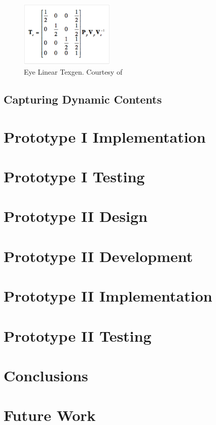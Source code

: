 \documentclass[]{article}
\begin{document}
\begin{figure}[hbtp]
    \centering
    \includegraphics[width=0.4\textwidth]{figures/EyeLinearTexgen.PNG}
    \caption{Eye Linear Texgen. Courtesy of \cite{cassNvidia}}
    \label{fig:EyeLinearTexgen}
\end{figure}

\subsection{Capturing Dynamic Contents}

\section{Prototype I Implementation}
\section{Prototype I Testing }
\section{Prototype II Design }
\section{Prototype II Development}
\section{Prototype II Implementation}
\section{Prototype II Testing}
\section{Conclusions}
\section{Future Work}

\newpage


\end{document}
